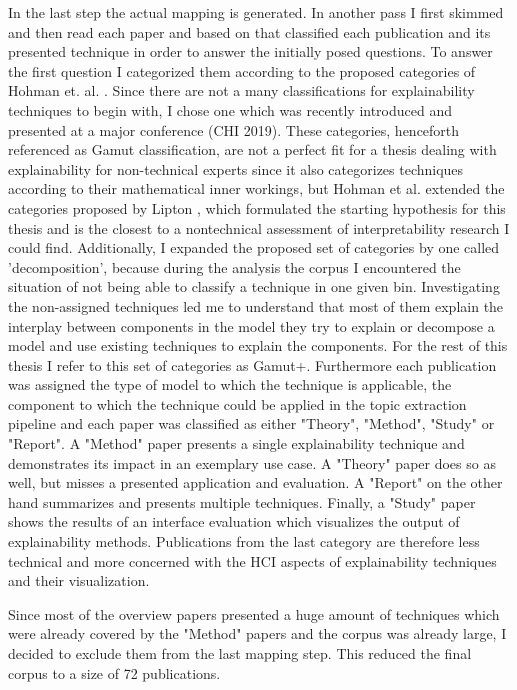 \begin{enumerate}
	In the last step the actual mapping is generated. In another pass I first skimmed and then read each paper and based on that classified each publication and its presented technique in order to answer the initially posed questions. To answer the first question I categorized them according to the proposed categories of Hohman et. al. \cite{hohmanGamutDesignProbe2019}. Since there are not a many classifications for explainability techniques to begin with, I chose one which was recently introduced and presented at a major conference (CHI 2019). These categories, henceforth referenced as Gamut classification, are not a perfect fit for a thesis dealing with explainability for non-technical experts since it also categorizes techniques according to their mathematical inner workings, but Hohman et al. extended the categories proposed by Lipton \cite{liptonMythosModelInterpretability2016a}, which formulated the starting hypothesis for this thesis and is the closest to a nontechnical assessment of interpretability research I could find. Additionally, I expanded the proposed set of categories by one called 'decomposition', because during the analysis the corpus I encountered the situation of not being able to classify a technique in one given bin. Investigating the non-assigned techniques led me to understand that most of them explain the interplay between components in the model they try to explain or decompose a model and use existing techniques to explain the components. For the rest of this thesis I refer to this set of categories as Gamut+.
	Furthermore each publication was assigned the type of model to which the technique is applicable, the component to which the technique could be applied in the topic extraction pipeline and each paper was classified as either "Theory", "Method", "Study" or "Report". 
	A "Method" paper presents a single explainability technique and demonstrates its impact in an exemplary use case. A "Theory" paper does so as well, but misses a presented application and evaluation. A "Report" on the other hand summarizes and presents multiple techniques. Finally, a "Study" paper shows the results of an interface evaluation which visualizes the output of explainability methods. Publications from the last category are therefore less technical and more concerned with the HCI aspects of explainability techniques and their visualization.
	
	Since most of the overview papers presented a huge amount of techniques which were already covered by the "Method" papers and the corpus was already large, I decided to exclude them from the last mapping step. This reduced the final corpus to a size of 72 publications.

\end{enumerate}

